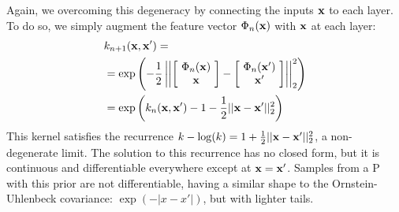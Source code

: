 \documentclass[twoside]{article}
\makeatletter
\newlength{\nonHumbleHeight}
\def\@humbleformat#1{{\settoheight{\nonHumbleHeight}{#1}\resizebox{!}{0.94\nonHumbleHeight}{#1}}}%
\def\humble#1{\@humbleformat{#1}}%
\newcommand{\gp}{{\humble GP}}
\makeatother
\begin{document}
Again, we overcoming this degeneracy by %
connecting the inputs ${\bf{x}}$ to each layer.  To do so, we simply augment the feature vector $\Phi_n({\bf{x}})$ with ${\bf{x}}$ at each layer:
%
\begin{align}
& k_{n+1}({\bf{x}}, {\bf{x}}') = \nonumber \\
& = \exp \left( -\frac{1}{2} \left|\left| \left[ \! \begin{array}{c} \Phi_n({\bf{x}}) \\ {\bf{x}} \end{array} \! \right]  - \left[ \! \begin{array}{c} \Phi_n({\bf{x}}') \\ {\bf{x}}' \end{array} \! \right] \right| \right|_2^2 \right) \nonumber \\
& = \exp \left( k_n({\bf{x}}, {\bf{x}}') - 1 -\frac{1}{2} || {\bf{x}} - {\bf{x}}' ||_2^2 \right)
\end{align}
%
%
This kernel satisfies the recurrence $k - \log(k) = 1 + \frac{1}{2} || {\bf{x}} - {\bf{x}}' ||_2^2$, a non-degenerate limit.  The solution to this recurrence has no closed form, but it is continuous and differentiable everywhere except at ${\bf{x}} = {\bf{x}}'$.
%
Samples from a \gp{} with this prior are not differentiable, having a similar shape to the Ornstein-Uhlenbeck covariance: $\exp( -|x - x'| )$, but with lighter tails.%

\end{document}
